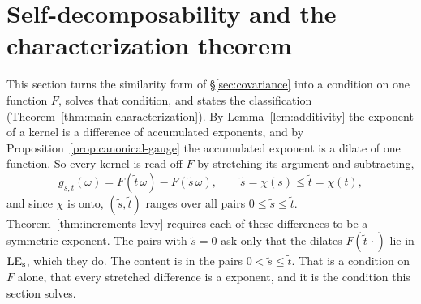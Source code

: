 %

\section{Self-decomposability and the characterization theorem}\label{sec:characterization}

This section turns the similarity form of \S\ref{sec:covariance} into a condition on one
function $F$, solves that condition, and states the classification
(Theorem~\ref{thm:main-characterization}). By Lemma~\ref{lem:additivity} the exponent of a
kernel is a difference of accumulated
exponents, and by Proposition~\ref{prop:canonical-gauge} the accumulated exponent is a dilate
of one function. So every kernel is read off $F$ by stretching its argument and subtracting,
\[
  g_{s,t}(\omega) = F(\tilde t\,\omega) - F(\tilde s\,\omega),
  \qquad \tilde s = \chi(s) \le \tilde t = \chi(t),
\]
and since $\chi$ is onto, $(\tilde s,\tilde t)$ ranges over all pairs $0 \le \tilde s \le
\tilde t$. Theorem~\ref{thm:increments-levy} requires each of these differences to be a
symmetric \Levy{} exponent. The pairs with $\tilde s = 0$ ask only that the dilates
$F(\tilde t\,\cdot)$ lie in $\mathrm{LE}_{\mathrm{s}}$, which they do. The content is in the pairs
$0 < \tilde s \le \tilde t$. That is a condition on $F$ alone, that every stretched
difference is a \Levy{} exponent, and it is the condition this section solves.

